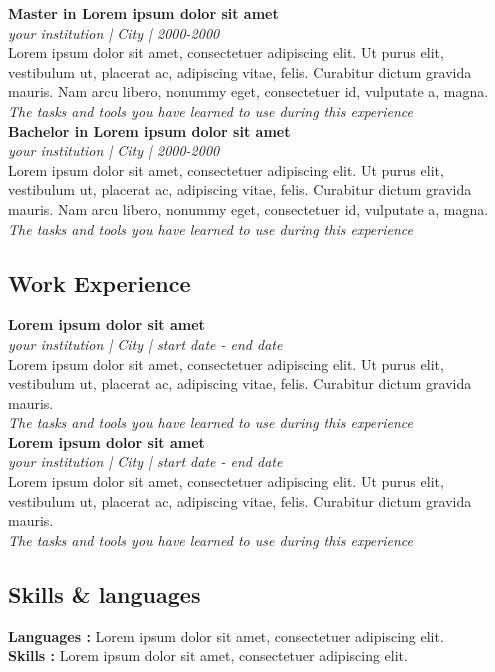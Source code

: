 \documentclass[10pts]{report}
\begin{document}
		\textbf{Master in Lorem ipsum dolor sit amet}\\ 
        \textit{your institution | City | 2000-2000}\vspace{0.1cm}\\
		Lorem ipsum dolor sit amet, consectetuer adipiscing elit. Ut purus elit, vestibulum ut,
        placerat ac, adipiscing vitae, felis. Curabitur dictum gravida mauris. Nam arcu libero,
        nonummy eget, consectetuer id, vulputate a, magna. \vspace{0.1cm}\\
        \textit{The tasks and tools you have learned to use during this experience}\vspace{0.3cm}\\
        \textbf{Bachelor in Lorem ipsum dolor sit amet}\\
		\textit{your institution | City | 2000-2000}\vspace{0.1cm}\\
		Lorem ipsum dolor sit amet, consectetuer adipiscing elit. Ut purus elit, vestibulum ut,
        placerat ac, adipiscing vitae, felis. Curabitur dictum gravida mauris. Nam arcu libero,
        nonummy eget, consectetuer id, vulputate a, magna. \vspace{0.1cm}\\
        \textit{The tasks and tools you have learned to use during this experience}\\
    \subsection*{Work Experience \hrulefill}

        \textbf{Lorem ipsum dolor sit amet}\\
		\textit{your institution | City | start date - end date}\vspace{0.1cm}\\
        Lorem ipsum dolor sit amet, consectetuer adipiscing elit. Ut purus elit, vestibulum ut,
        placerat ac, adipiscing vitae, felis. Curabitur dictum gravida mauris.\vspace{0.1cm}\\
        \textit{The tasks and tools you have learned to use during this experience}\vspace{0.3cm}\\
        \textbf{Lorem ipsum dolor sit amet}\\
		\textit{your institution | City | start date - end date}\vspace{0.1cm}\\
        Lorem ipsum dolor sit amet, consectetuer adipiscing elit. Ut purus elit, vestibulum ut,
        placerat ac, adipiscing vitae, felis. Curabitur dictum gravida mauris.\vspace{0.1cm}\\
        \textit{The tasks and tools you have learned to use during this experience}\vspace{0.3cm}\\
	\subsection*{Skills \& languages \hrulefill}
	 	\textbf{Languages :} Lorem ipsum dolor sit amet, consectetuer adipiscing elit.\vspace{0.1cm}\\
		\textbf{Skills :} Lorem ipsum dolor sit amet, consectetuer adipiscing elit.\\
\end{document}
